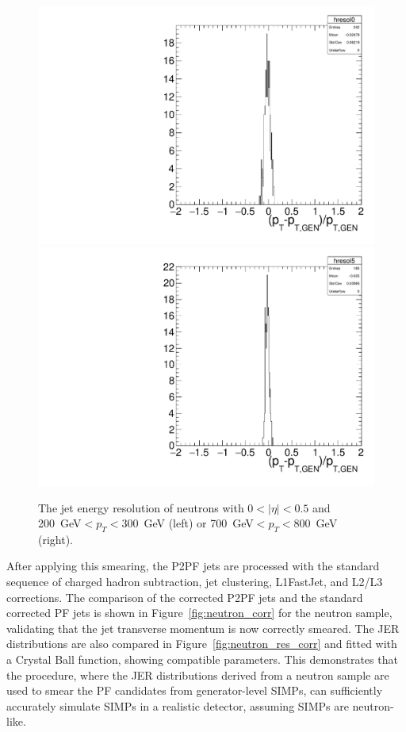 \begin{figure}[ht]
  \centering
 \includegraphics[width=.48\textwidth]{pt_res_ptbin_0.pdf} \hfill
\includegraphics[width=.48\textwidth]{pt_res_ptbin_5.pdf}
 \caption{The jet energy resolution of neutrons with $0< |\eta| < 0.5$ and \SI{200}{GeV}$<p_T<$\SI{300}{GeV} (left) or \SI{700}{GeV}$<p_T<$\SI{800}{GeV} (right).}
 \label{fig:neutron_res}
\end{figure}

After applying this smearing, the P2PF jets are processed with the standard sequence of charged hadron subtraction, jet clustering, L1FastJet, and L2/L3 corrections. The comparison of the corrected P2PF jets and the standard corrected \ac{PF} jets is shown in Figure~\ref{fig:neutron_corr} for the neutron sample, validating that the jet transverse momentum is now correctly smeared. The \ac{JER} distributions are also compared in Figure~\ref{fig:neutron_res_corr} and fitted with a Crystal Ball function, showing compatible parameters. This demonstrates that the procedure, where the \ac{JER} distributions derived from a neutron sample are used to smear the \ac{PF} candidates from generator-level \acp{SIMP}, can sufficiently accurately simulate \acp{SIMP} in a realistic detector, assuming \acp{SIMP} are neutron-like.

